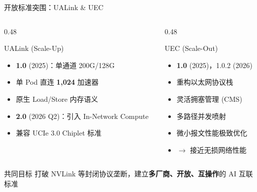\documentclass[aspectratio=169, 10pt, UTF8]{ctexbeamer}
\begin{document}
\begin{frame}{开放标准突围：UALink \& UEC}
  \begin{columns}[T]
    \begin{column}{0.48\textwidth}
      \begin{block}{UALink (Scale-Up)}
        \begin{itemize}
          \item \textbf{1.0} (2025)：单通道 200G/128G
          \item 单 Pod 直连 \textbf{1,024} 加速器
          \item 原生 Load/Store 内存语义
          \item \textbf{2.0} (2026 Q2)：引入 In-Network Compute
          \item 兼容 UCIe 3.0 Chiplet 标准
        \end{itemize}
      \end{block}
    \end{column}
    \begin{column}{0.48\textwidth}
      \begin{exampleblock}{UEC (Scale-Out)}
        \begin{itemize}
          \item \textbf{1.0} (2025)，1.0.2 (2026)
          \item 重构以太网协议栈
          \item 灵活拥塞管理 (CMS)
          \item 多路径并发喷射
          \item 微小报文性能极致优化
          \item $\to$ 接近无损网络性能
        \end{itemize}
      \end{exampleblock}
    \end{column}
  \end{columns}

  \begin{alertblock}{共同目标}
    打破 NVLink 等封闭协议垄断，建立\textbf{多厂商、开放、互操作}的 AI 互联标准
  \end{alertblock}
\end{frame}
\end{document}
